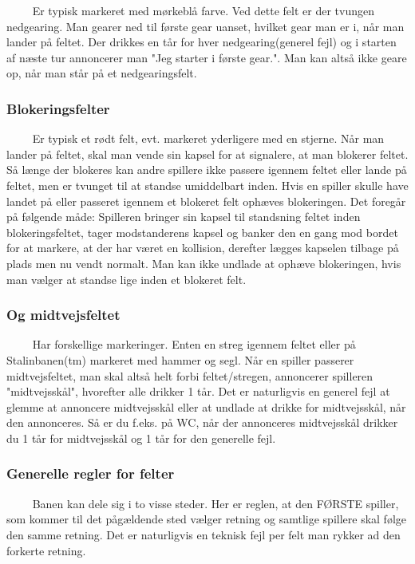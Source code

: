 \documentclass[12pt]{article}
\begin{document}
$\qquad$ Er typisk markeret med mørkeblå farve. Ved dette felt er der tvungen nedgearing. Man gearer ned til første gear uanset, hvilket gear man er i, når man lander på feltet. Der drikkes en tår for hver nedgearing(generel fejl) og i starten af næste tur annoncerer man "Jeg starter i første gear.". Man kan altså ikke geare op, når man står på et nedgearingsfelt.

\subsubsection*{Blokeringsfelter}

$\qquad$ Er typisk et rødt felt, evt. markeret yderligere med en stjerne. Når man lander på feltet, skal man vende sin kapsel for at signalere, at man blokerer feltet. Så længe der blokeres kan andre spillere ikke passere igennem feltet eller lande på feltet, men er tvunget til at standse umiddelbart inden. Hvis en spiller skulle have landet på eller passeret igennem et blokeret felt ophæves blokeringen. Det foregår på følgende måde: Spilleren bringer sin kapsel til standsning feltet inden blokeringsfeltet, tager modstanderens kapsel og banker den en gang mod bordet for at markere, at der har været en kollision, derefter lægges kapselen tilbage på plads men nu vendt normalt. Man kan ikke undlade at ophæve blokeringen, hvis man vælger at standse lige inden et blokeret felt.

\subsubsection*{Og midtvejsfeltet}
$\qquad$ Har forskellige markeringer. Enten en streg igennem feltet eller på Stalinbanen(tm) markeret med hammer og segl.
Når en spiller passerer midtvejsfeltet, man skal altså helt forbi feltet/stregen, annoncerer spilleren "midtvejsskål", hvorefter alle drikker 1 tår. Det er naturligvis en generel fejl at glemme at annoncere midtvejsskål eller at undlade at drikke for midtvejsskål, når den annonceres. Så er du f.eks. på WC, når der annonceres midtvejsskål drikker du 1 tår for midtvejsskål og 1 tår for den generelle fejl.

\subsubsection*{Generelle regler for felter}

$\qquad$ Banen kan dele sig i to visse steder. Her er reglen, at den FØRSTE spiller, som kommer til det pågældende sted vælger retning og samtlige spillere skal følge den samme retning. Det er naturligvis en teknisk fejl per felt man rykker ad den forkerte retning.\\
\end{document}
